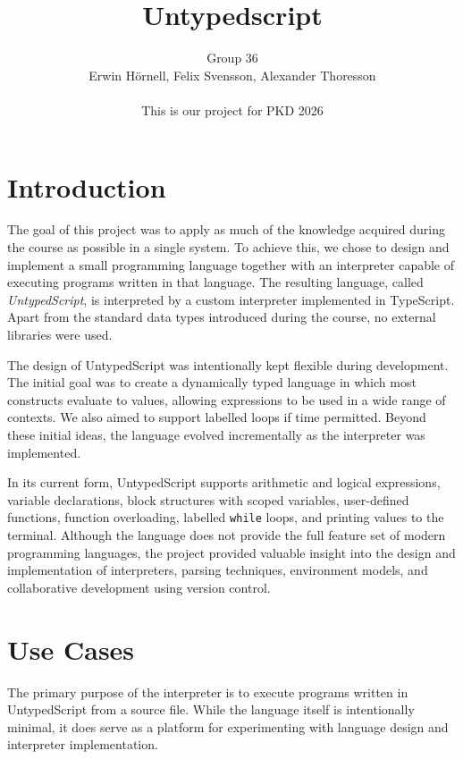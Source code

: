 \documentclass[12pt,a4paper]{article}
\title{Untypedscript}
\author{Group 36
\\Erwin Hörnell, Felix Svensson, Alexander Thoresson
\\\\This is our project for PKD 2026}
\begin{document}
\maketitle

\newpage

\tableofcontents

\newpage


\section{Introduction}

The goal of this project was to apply as much of the knowledge acquired during the course as possible in a single system. To achieve this, we chose to design and implement a small programming language together with an interpreter capable of executing programs written in that language. The resulting language, called \textit{UntypedScript}, is interpreted by a custom interpreter implemented in TypeScript. Apart from the standard data types introduced during the course, no external libraries were used.

The design of UntypedScript was intentionally kept flexible during development. The initial goal was to create a dynamically typed language in which most constructs evaluate to values, allowing expressions to be used in a wide range of contexts. We also aimed to support labelled loops if time permitted. Beyond these initial ideas, the language evolved incrementally as the interpreter was implemented.

In its current form, UntypedScript supports arithmetic and logical expressions, variable declarations, block structures with scoped variables, user-defined functions, function overloading, labelled \texttt{while} loops, and printing values to the terminal. Although the language does not provide the full feature set of modern programming languages, the project provided valuable insight into the design and implementation of interpreters, parsing techniques, environment models, and collaborative development using version control.

\section{Use Cases}
The primary purpose of the interpreter is to execute programs written in UntypedScript from a source file. While the language itself is intentionally minimal, it does serve as a platform for experimenting with language design and interpreter implementation.
\end{document}
